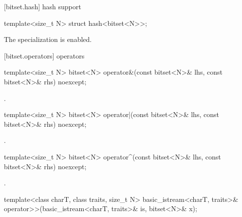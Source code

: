 [bitset.hash]{ hash support}

%
\begin{itemdecl}
template<size_t N> struct hash<bitset<N>>;
\end{itemdecl}

\begin{itemdescr}
\pnum
The specialization is enabled.
\end{itemdescr}


[bitset.operators]{ operators}

%
\begin{itemdecl}
template<size_t N>
  bitset<N> operator&(const bitset<N>& lhs, const bitset<N>& rhs) noexcept;
\end{itemdecl}

\begin{itemdescr}
\pnum
\returns
{}.
\end{itemdescr}

%
\begin{itemdecl}
template<size_t N>
  bitset<N> operator|(const bitset<N>& lhs, const bitset<N>& rhs) noexcept;
\end{itemdecl}

\begin{itemdescr}
\pnum
\returns
{}.
\end{itemdescr}

%
\begin{itemdecl}
template<size_t N>
  bitset<N> operator^(const bitset<N>& lhs, const bitset<N>& rhs) noexcept;
\end{itemdecl}

\begin{itemdescr}
\pnum
\returns
{}.
\end{itemdescr}

%
\begin{itemdecl}
template<class charT, class traits, size_t N>
  basic_istream<charT, traits>&
    operator>>(basic_istream<charT, traits>& is, bitset<N>& x);
\end{itemdecl}

